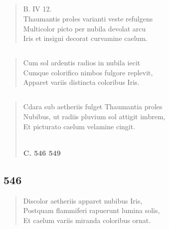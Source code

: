 \documentclass[11pt, a4paper]{report}
\begin{document}
            \subsection*{}
      \begin{verse}
      B. IV 12. \\ Thaumantis proles varianti veste refulgens \\ Multicolor picto per nubila devolat arcu \\ Iris et insigni decorat curvamine caelum. \\ 
      \end{verse}
  
            \subsection*{}
      \begin{verse}
      Cum sol ardentis radios in nubila iecit \\ Cumque colorifico nimbos fulgore replevit, \\ Apparet variis distincta coloribus Iris. \\ 
      \end{verse}
  
            \subsection*{}
      \begin{verse}
      Cdara sub aetheriis fulget Thaumantia proles \\ Nubibus, ut radiis pluvium sol attigit imbrem, \\ Et picturato caelum velamine cingit. \\ 
        ﻿\pagebreak 
     \marginpar{[70]} \begin{center} \textbf{C. 546 549} \end{center}
      \end{verse}
  
            \subsection*{546}
      \begin{verse}
      Discolor aetheriis apparet nubibus Iris, \\ Postquam flammiferi rapuerunt lumina solis, \\ Et caelum variis miranda coloribus ornat. \\ 
      \end{verse}
  
\end{document}
